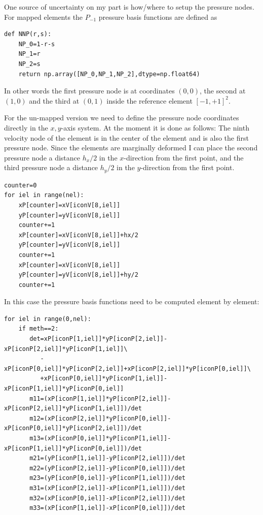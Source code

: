 One source of uncertainty on my part is how/where to setup the pressure nodes.
For mapped elements the $P_{-1}$ pressure basis functions are defined as 
\begin{lstlisting}
def NNP(r,s):
    NP_0=1-r-s
    NP_1=r
    NP_2=s
    return np.array([NP_0,NP_1,NP_2],dtype=np.float64)
\end{lstlisting}
In other words the first pressure node is at coordinates $(0,0)$,
the second at $(1,0)$ and the third at $(0,1)$ inside the reference element $[-1,+1]^2$.

For the un-mapped version we need to define the pressure node coordinates 
directly in the $x,y$-axis system.
At the moment it is done as follows: The ninth velocity node of the element is 
in the center of the element and is also the first pressure node.
Since the elements are marginally deformed I can place the second pressure node 
a distance $h_x/2$ in the $x$-direction from the first point, and the third pressure node 
a distance $h_y/2$ in the $y$-direction from the first point.

\begin{lstlisting}
counter=0
for iel in range(nel):
    xP[counter]=xV[iconV[8,iel]]
    yP[counter]=yV[iconV[8,iel]]
    counter+=1
    xP[counter]=xV[iconV[8,iel]]+hx/2
    yP[counter]=yV[iconV[8,iel]]
    counter+=1
    xP[counter]=xV[iconV[8,iel]]
    yP[counter]=yV[iconV[8,iel]]+hy/2
    counter+=1
\end{lstlisting}
In this case the pressure basis functions need to be computed
element by element:

\begin{lstlisting}
for iel in range(0,nel):
    if meth==2:
       det=xP[iconP[1,iel]]*yP[iconP[2,iel]]-xP[iconP[2,iel]]*yP[iconP[1,iel]]\
          -xP[iconP[0,iel]]*yP[iconP[2,iel]]+xP[iconP[2,iel]]*yP[iconP[0,iel]]\
          +xP[iconP[0,iel]]*yP[iconP[1,iel]]-xP[iconP[1,iel]]*yP[iconP[0,iel]]
       m11=(xP[iconP[1,iel]]*yP[iconP[2,iel]]-xP[iconP[2,iel]]*yP[iconP[1,iel]])/det
       m12=(xP[iconP[2,iel]]*yP[iconP[0,iel]]-xP[iconP[0,iel]]*yP[iconP[2,iel]])/det
       m13=(xP[iconP[0,iel]]*yP[iconP[1,iel]]-xP[iconP[1,iel]]*yP[iconP[0,iel]])/det
       m21=(yP[iconP[1,iel]]-yP[iconP[2,iel]])/det
       m22=(yP[iconP[2,iel]]-yP[iconP[0,iel]])/det
       m23=(yP[iconP[0,iel]]-yP[iconP[1,iel]])/det
       m31=(xP[iconP[2,iel]]-xP[iconP[1,iel]])/det
       m32=(xP[iconP[0,iel]]-xP[iconP[2,iel]])/det
       m33=(xP[iconP[1,iel]]-xP[iconP[0,iel]])/det
\end{lstlisting}


